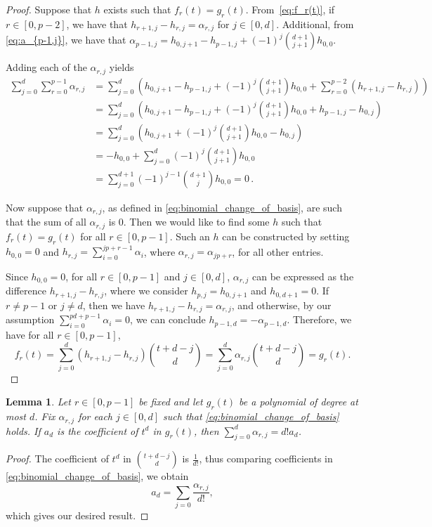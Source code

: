 \documentclass[12pt]{amsart}
\newtheorem{lemma}[thm]{Lemma}
\theoremstyle{definition}
\numberwithin{equation}{section}
\renewcommand\>{\rangle}
\newcommand\<{\langle}
\newcommand\0{\mathbf{0}}
\begin{document}
\begin{proof}
	Suppose that $h$ exists such that $f_r(t) = g_r(t)$. From~\eqref{eq:f_r(t)}, if $r \in [0,p-2]$, we have that $h_{r+1,j} - h_{r,j} = \alpha_{r,j}$ for $j \in [0,d]$.
	Additional, from \eqref{eq:a_{p-1,j}}, we have that $\alpha_{p-1,j} = h_{0,j+1} - h_{p-1,j} + (-1)^j\binom{d+1}{j+1}h_{0,0}$. 
	
	Adding each of the $\alpha_{r,j}$ yields
	\begin{align*}
		\sum_{j=0}^{d} \sum_{r=0}^{p-1} \alpha_{r,j} &= \sum_{j=0}^d \left(h_{0,j+1} - h_{p-1,j} + (-1)^j \binom{d+1}{j+1} h_{0,0} + \sum_{r=0}^{p-2} (h_{r+1,j} - h_{r,j})\right)\\
		&=\sum_{j=0}^d \left(h_{0,j+1} - h_{p-1,j} + (-1)^j \binom{d+1}{j+1} h_{0,0} + h_{p-1,j} - h_{0,j}\right)\\
		&= \sum_{j=0}^d \left(h_{0,j+1} + (-1)^j \binom{d+1}{j+1} h_{0,0} - h_{0,j}\right)\\
		&= -h_{0,0} + \sum_{j=0}^d  (-1)^j \binom{d+1}{j+1} h_{0,0}\\
		&= \sum_{j=0}^{d+1}  (-1)^{j-1} \binom{d+1}{j} h_{0,0} = 0\, .
	\end{align*}
	
	Now suppose that $\alpha_{r,j}$, as defined in \eqref{eq:binomial_change_of_basis}, are such that the sum of all $\alpha_{r,j}$ is 0. Then we would like to find some $h$ such that $f_r(t) = g_r(t)$ for all $r \in [0,p-1]$. Such an $h$ can be constructed by setting $h_{0,0} = 0$ and $h_{r,j}= \sum_{i=0}^{jp+r-1} \alpha_i$, where $\alpha_{r,j} = \alpha_{jp+r}$, for all other entries.
	
	
	Since $h_{0,0} = 0$, for all $r \in [0,p-1]$ and $j \in [0,d]$, $\alpha_{r,j}$ can be expressed as the difference $h_{r+1,j} - h_{r,j}$, where we consider $h_{p,j} = h_{0, j+1}$ and $h_{0,d+1} = 0$. If $r \neq p-1$ or $j \neq d$, then we have $h_{r+1,j} - h_{r,j} = \alpha_{r,j}$, and otherwise, by our assumption $\sum_{i=0}^{pd+p-1} \alpha_i = 0$, we can conclude $h_{p-1,d} = -\alpha_{p-1,d}$.
	Therefore, we have for all $r \in [0,p-1]$,
	\[f_r(t) = \sum_{j = 0}^d (h_{r+1,j} - h_{r,j}) \binom{t+d-j}{d} = \sum_{j = 0}^d \alpha_{r,j} \binom{t+d-j}{d} = g_r(t).\]
\end{proof}

\begin{lemma}\label{l:sum_alpha}
	Let $r \in [0,p-1]$ be fixed and let $g_r(t)$ be a polynomial of degree at most $d$. Fix $\alpha_{r,j}$ for each $j \in [0,d]$ such that \eqref{eq:binomial_change_of_basis} holds.
	If $a_d$ is the coefficient of $t^d$ in $g_r(t)$, then $\sum_{j=0}^d \alpha_{r,j} = d! a_d $.
\end{lemma}
\begin{proof}
	The coefficient of $t^d$ in $\binom{t+d-j}{d}$ is $\frac{1}{d!}$, thus comparing coefficients in \eqref{eq:binomial_change_of_basis}, we obtain
	\[a_d = \sum_{j = 0} \frac{\alpha_{r,j}}{d!},\]
	which gives our desired result.
\end{proof}
\end{document}
